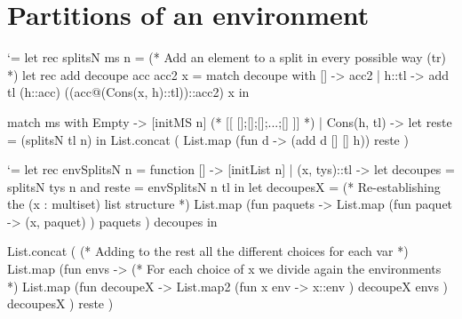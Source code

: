 \documentclass{article}
\let\origlstlisting=\lstlisting
\let\endoriglstlisting=\endlstlisting
\renewenvironment{lstlisting}
{\mathcode`\-=\hyphenmathcode
    \everymath{}\mathsurround=0pt\origlstlisting}
{\endoriglstlisting}
\begin{document}
\section{Partitions of an environment}
\label {a_part}
\begin{lstlisting}
let rec splitsN ms n = 
  (* Add an element to a split in every possible way (tr) *)
  let rec add decoupe acc acc2 x = match decoupe with 
    [] -> acc2
    | h::tl ->  add tl (h::acc) ((acc@(Cons(x, h)::tl))::acc2) x
  in
   
  match ms with
    Empty -> [initMS n] (* [[ [];[];[];...;[] ]] *)
    | Cons(h, tl) -> let reste = (splitsN tl n) in
       List.concat (
         List.map (fun d ->  (add d [] [] h)) reste
       )
\end{lstlisting}

\begin{lstlisting}
let rec envSplitsN n = function
  [] -> [initList n]
  | (x, tys)::tl -> let decoupes = splitsN tys n 
                       and reste = envSplitsN n tl in
    let decoupesX = 
      (* Re-establishing the (x : multiset) list structure *)
      List.map (fun paquets -> 
        List.map (fun paquet -> 
            (x, paquet)
        ) paquets
      ) decoupes in
            
    List.concat (
      (* Adding to the rest all the different choices for each var *)
      List.map (fun envs -> 
        (* For each choice of x we divide again the environments *)
        List.map (fun decoupeX -> 
          List.map2 (fun x env -> 
            x::env
          ) decoupeX envs
        ) decoupesX
      ) reste
    )
\end{lstlisting}

\newpage
\end{document}
